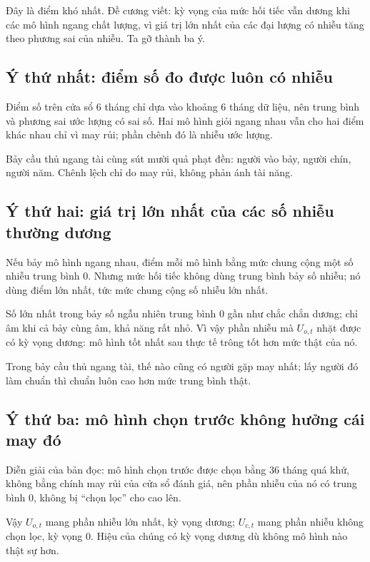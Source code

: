 Đây là điểm khó nhất. Đề cương viết: kỳ vọng của mức hối tiếc vẫn dương khi các mô hình ngang chất lượng, vì giá trị lớn nhất của các đại lượng có nhiễu tăng theo phương sai của nhiễu. Ta gỡ thành ba ý.

\subsection{Ý thứ nhất: điểm số đo được luôn có nhiễu}

Điểm số trên cửa sổ 6 tháng chỉ dựa vào khoảng 6 tháng dữ liệu, nên trung bình và phương sai ước lượng có sai số. Hai mô hình giỏi ngang nhau vẫn cho hai điểm khác nhau chỉ vì may rủi; phần chênh đó là nhiễu ước lượng.

Bảy cầu thủ ngang tài cùng sút mười quả phạt đền: người vào bảy, người chín, người năm. Chênh lệch chỉ do may rủi, không phản ánh tài năng.

\subsection{Ý thứ hai: giá trị lớn nhất của các số nhiễu thường dương}

Nếu bảy mô hình ngang nhau, điểm mỗi mô hình bằng mức chung cộng một số nhiễu trung bình 0. Nhưng mức hối tiếc không dùng trung bình bảy số nhiễu; nó dùng điểm lớn nhất, tức mức chung cộng số nhiễu lớn nhất.

Số lớn nhất trong bảy số ngẫu nhiên trung bình 0 gần như chắc chắn dương; chỉ âm khi cả bảy cùng âm, khả năng rất nhỏ. Vì vậy phần nhiễu mà \(U_{o,t}\) nhặt được có kỳ vọng dương: mô hình tốt nhất sau thực tế trông tốt hơn mức thật của nó.

Trong bảy cầu thủ ngang tài, thế nào cũng có người gặp may nhất; lấy người đó làm chuẩn thì chuẩn luôn cao hơn mức trung bình thật.

\subsection{Ý thứ ba: mô hình chọn trước không hưởng cái may đó}

Diễn giải của bản đọc: mô hình chọn trước được chọn bằng 36 tháng quá khứ, không bằng chính may rủi của cửa sổ đánh giá, nên phần nhiễu của nó có trung bình 0, không bị “chọn lọc” cho cao lên.

Vậy \(U_{o,t}\) mang phần nhiễu lớn nhất, kỳ vọng dương; \(U_{c,t}\) mang phần nhiễu không chọn lọc, kỳ vọng 0. Hiệu của chúng có kỳ vọng dương dù không mô hình nào thật sự hơn.

